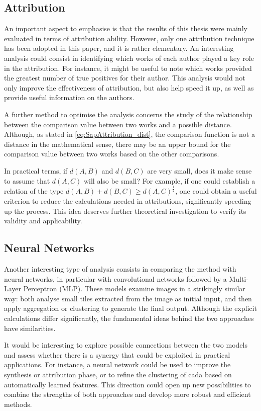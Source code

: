 \begin{toReview}
\subsection{Attribution}
An important aspect to emphasise is that the results of this thesis were mainly evaluated in terms of attribution ability. However, only one attribution technique has been adopted in this paper, and it is rather elementary. An interesting analysis could consist in identifying which works of each author played a key role in the attribution. For instance, it might be useful to note which works provided the greatest number of true positives for their author. This analysis would not only improve the effectiveness of attribution, but also help speed it up, as well as provide useful information on the authors.

\noindent A further method to optimise the analysis concerns the study of the relationship between the comparison value between two works and a possible distance. Although, as stated in \cref{eq:SapAttribution_dist}, the comparison function is not a distance in the mathematical sense, there may be an upper bound for the comparison value between two works based on the other comparisons.

\noindent In practical terms, if $d(A,B)$ and $d(B,C)$ are very small, does it make sense to assume that $d(A,C)$ will also be small? For example, if one could establish a relation of the type $d(A,B)+d(B,C) \geq d(A,C)^\frac12$, one could obtain a useful criterion to reduce the calculations needed in attributions, significantly speeding up the process. This idea deserves further theoretical investigation to verify its validity and applicability.

\subsection{Neural Networks}
Another interesting type of analysis consists in comparing the method with neural networks, in particular with convolutional networks followed by a Multi-Layer Perceptron (MLP). These models examine images in a strikingly similar way: both analyse small tiles extracted from the image as initial input, and then apply aggregation or clustering to generate the final output. Although the explicit calculations differ significantly, the fundamental ideas behind the two approaches have similarities.

\noindent It would be interesting to explore possible connections between the two models and assess whether there is a synergy that could be exploited in practical applications. For instance, a neural network could be used to improve the synthesis or attribution phase, or to refine the clustering of \gls{cada} based on automatically learned features. This direction could open up new possibilities to combine the strengths of both approaches and develop more robust and efficient methods.


\end{toReview}
